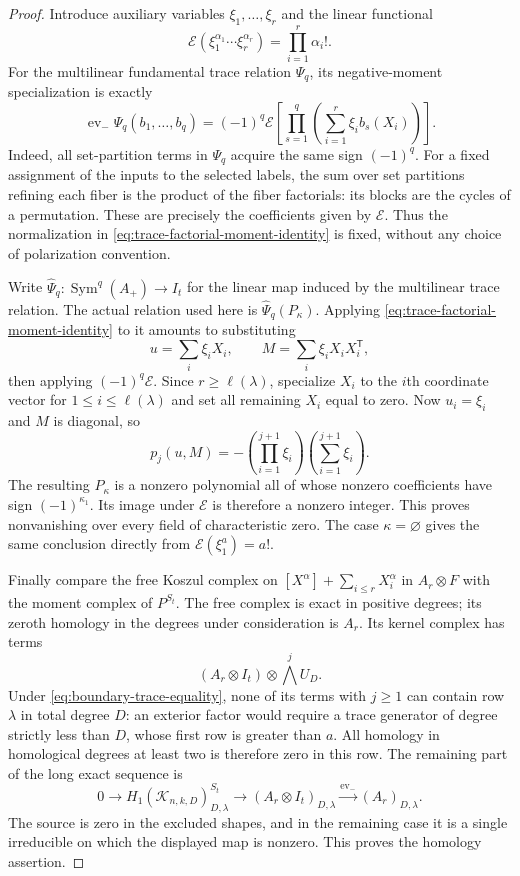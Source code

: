 \begin{proof}
Introduce auxiliary variables $\xi_1,\ldots,\xi_r$ and the
linear functional
\[
       \mathcal E(\xi_1^{\alpha_1}\cdots\xi_r^{\alpha_r})
                       =\prod_{i=1}^r\alpha_i!.
\]
For the multilinear fundamental trace relation $\Psi_q$, its
negative-moment specialization is exactly
\begin{equation}\label{eq:trace-factorial-moment-identity}
 \operatorname{ev}_{-}\Psi_q(b_1,\ldots,b_q)
  =(-1)^q\mathcal E\!\left[
              \prod_{s=1}^{q}\left(\sum_{i=1}^r
                                  \xi_i b_s(X_i)\right)\right].
\end{equation}
Indeed, all set-partition terms in $\Psi_q$ acquire the same
sign $(-1)^q$.  For a fixed assignment of the inputs to the
selected labels, the sum over set partitions refining each fiber
is the product of the fiber factorials: its blocks are the cycles
of a permutation.  These are precisely the coefficients given
by $\mathcal E$.  Thus the normalization in
\eqref{eq:trace-factorial-moment-identity} is fixed, without any
choice of polarization convention.

Write $\widehat\Psi_q:\operatorname{Sym}^q(A_+)\to I_t$ for
the linear map induced by the multilinear trace relation.  The
actual relation used here is $\widehat\Psi_q(P_\kappa)$.
Applying \eqref{eq:trace-factorial-moment-identity} to it amounts
to substituting
\[
             u=\sum_i\xi_iX_i,\qquad
             M=\sum_i\xi_iX_iX_i^{\mathsf T},
\]
then applying $(-1)^q\mathcal E$.  Since
$r\ge\ell(\lambda)$, specialize $X_i$ to the $i$th coordinate
vector for $1\le i\le\ell(\lambda)$ and set all remaining
$X_i$ equal to zero.  Now $u_i=\xi_i$ and $M$ is diagonal, so
\[
 p_j(u,M)=-\left(\prod_{i=1}^{j+1}\xi_i\right)
                    \left(\sum_{i=1}^{j+1}\xi_i\right).
\]
The resulting $P_\kappa$ is a nonzero polynomial all of whose
nonzero coefficients have sign $(-1)^{\kappa_1}$.
Its image under $\mathcal E$ is therefore a nonzero integer.
This proves nonvanishing over every field of characteristic zero.
The case $\kappa=\varnothing$ gives the same conclusion directly
from $\mathcal E(\xi_1^a)=a!$.

Finally compare the free Koszul complex on
$[X^\alpha]+\sum_{i\le r}X_i^\alpha$ in $A_r\otimes F$
with the moment complex of $P^{S_t}$.  The free complex is exact
in positive degrees; its zeroth homology in the degrees under
consideration is $A_r$.  Its kernel complex has terms
\[
       (A_r\otimes I_t)\otimes\bigwedge^j U_D.
\]
Under \eqref{eq:boundary-trace-equality}, none of its terms with
$j\ge1$ can contain row $\lambda$ in total degree $D$:
an exterior factor would require a trace generator of degree
strictly less than $D$, whose first row is greater than $a$.
All homology in homological degrees at least two is therefore zero
in this row.  The remaining part of the long exact sequence is
\[
 0\longrightarrow H_1(\mathcal K_{n,k,D})^{S_t}_{D,\lambda}
      \longrightarrow
 (A_r\otimes I_t)_{D,\lambda}
             \xrightarrow{\operatorname{ev}_{-}}
                         (A_r)_{D,\lambda}.
\]
The source is zero in the excluded shapes, and in the remaining
case it is a single irreducible on which the displayed map is
nonzero.  This proves the homology assertion.
\end{proof}

